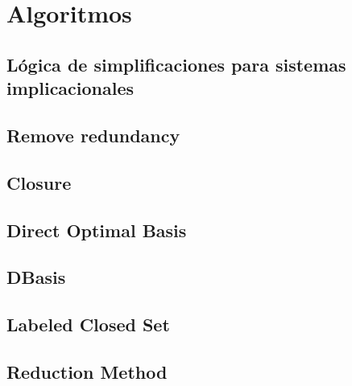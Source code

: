 \section{Algoritmos}

\subsection{L\'ogica de simplificaciones para sistemas implicacionales}

 
\newpage

\subsection{Remove redundancy}

 
\newpage

\subsection{Closure}

 
\newpage

\subsection{Direct Optimal Basis}

 
\newpage

\subsection{DBasis}

 
\newpage

\subsection{Labeled Closed Set}

 
\newpage

\subsection{Reduction Method}

 

\newpage
\thispagestyle{empty}
\mbox{}

\newpage